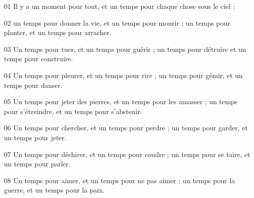 01 Il y a un moment pour tout, et un temps pour chaque chose sous le ciel :

02 un temps pour donner la vie, et un temps pour mourir ; un temps pour planter, et un temps pour arracher.

03 Un temps pour tuer, et un temps pour guérir ; un temps pour détruire et un temps pour construire.

04 Un temps pour pleurer, et un temps pour rire ; un temps pour gémir, et un temps pour danser.

05 Un temps pour jeter des pierres, et un temps pour les amasser ; un temps pour s’étreindre, et un temps pour s’abstenir.

06 Un temps pour chercher, et un temps pour perdre ; un temps pour garder, et un temps pour jeter.

07 Un temps pour déchirer, et un temps pour coudre ; un temps pour se taire, et un temps pour parler.

08 Un temps pour aimer, et un temps pour ne pas aimer ; un temps pour la guerre, et un temps pour la paix.

